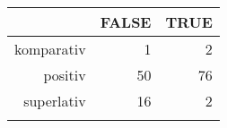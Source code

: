 \begin{tabular}{rrr}
  \lsptoprule
 & FALSE & TRUE \\ 
  \midrule
komparativ & 1 & 2 \\ 
  positiv & 50 & 76 \\ 
  superlativ & 16 & 2 \\ 
   \lspbottomrule
\end{tabular}
